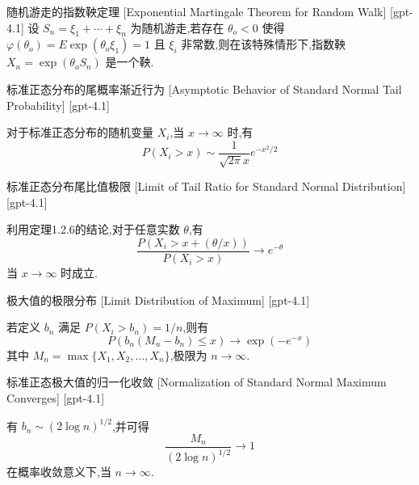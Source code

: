 \documentclass[UTF8]{ctexart}
\begin{document}
    \begin{thm}
        {随机游走的指数鞅定理}
        [Exponential Martingale Theorem for Random Walk]
        [gpt-4.1]
        设 $S_{n} = \xi_{1} + \cdots + \xi_{n}$ 为随机游走,若存在 $\theta_{o} < 0$ 使得 $\varphi(\theta_{o}) = E \exp(\theta_{o} \xi_{1}) = 1$ 且 $\xi_{i}$ 非常数,则在该特殊情形下,指数鞅 $X_{n} = \exp(\theta_{o} S_{n})$ 是一个鞅.
    \end{thm}
    
    
    
    \begin{thm}
        {标准正态分布的尾概率渐近行为}
        [Asymptotic Behavior of Standard Normal Tail Probability]
        [gpt-4.1]
        
对于标准正态分布的随机变量 $X_i$,当 $x \to \infty$ 时,有
\[
P(X_i > x) \sim \frac{1}{\sqrt{2\pi} x} e^{-x^2/2}
\]

    \end{thm}
    
    
    
    \begin{crl}
        {标准正态分布尾比值极限}
        [Limit of Tail Ratio for Standard Normal Distribution]
        [gpt-4.1]
        
利用定理1.2.6的结论,对于任意实数 $\theta$,有
\[
\frac{P(X_i > x + (\theta / x))}{P(X_i > x)} \to e^{-\theta}
\]
当 $x \to \infty$ 时成立.

    \end{crl}
    
    
    
    \begin{thm}
        {极大值的极限分布}
        [Limit Distribution of Maximum]
        [gpt-4.1]
        
若定义 $b_n$ 满足 $P(X_i > b_n) = 1/n$,则有
\[
P(b_n(M_n - b_n) \leq x) \to \exp(-e^{-x})
\]
其中 $M_n = \max\{X_1, X_2, \dots, X_n\}$,极限为 $n \to \infty$.

    \end{thm}
    
    
    
    \begin{crl}
        {标准正态极大值的归一化收敛}
        [Normalization of Standard Normal Maximum Converges]
        [gpt-4.1]
        
有 $b_n \sim (2 \log n)^{1/2}$,并可得
\[
\frac{M_n}{(2 \log n)^{1/2}} \to 1
\]
在概率收敛意义下,当 $n \to \infty$.

    \end{crl}
    
\end{document}
